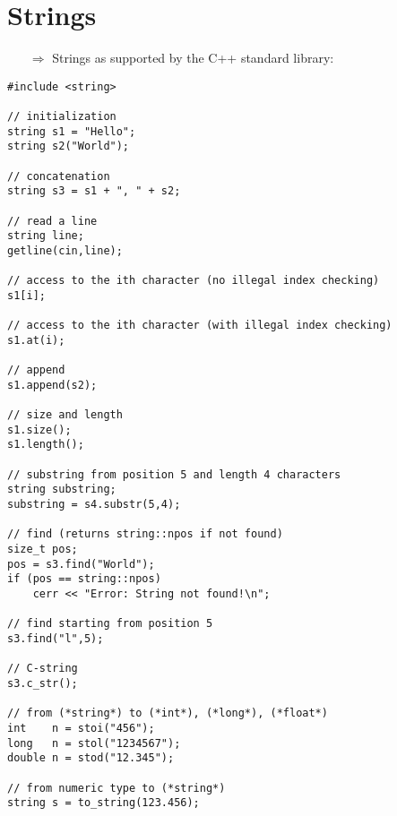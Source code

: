 \documentclass[10pt]{article}
\begin{document}
\section{Strings}
\small
\begin{enumerate}
\item[$\Rightarrow$] Strings as supported by the C++ standard library:
\end{enumerate}
\begin{lstlisting}
#include <string>

// initialization
string s1 = "Hello";
string s2("World");

// concatenation
string s3 = s1 + ", " + s2;

// read a line
string line;
getline(cin,line);

// access to the ith character (no illegal index checking)
s1[i];

// access to the ith character (with illegal index checking)
s1.at(i);

// append
s1.append(s2);

// size and length
s1.size();
s1.length();

// substring from position 5 and length 4 characters
string substring;
substring = s4.substr(5,4);

// find (returns string::npos if not found)
size_t pos;
pos = s3.find("World");
if (pos == string::npos)
    cerr << "Error: String not found!\n";

// find starting from position 5
s3.find("l",5);

// C-string
s3.c_str();

// from (*string*) to (*int*), (*long*), (*float*)
int    n = stoi("456");
long   n = stol("1234567");
double n = stod("12.345");

// from numeric type to (*string*)
string s = to_string(123.456);
\end{lstlisting}
%
%
\end{document}
